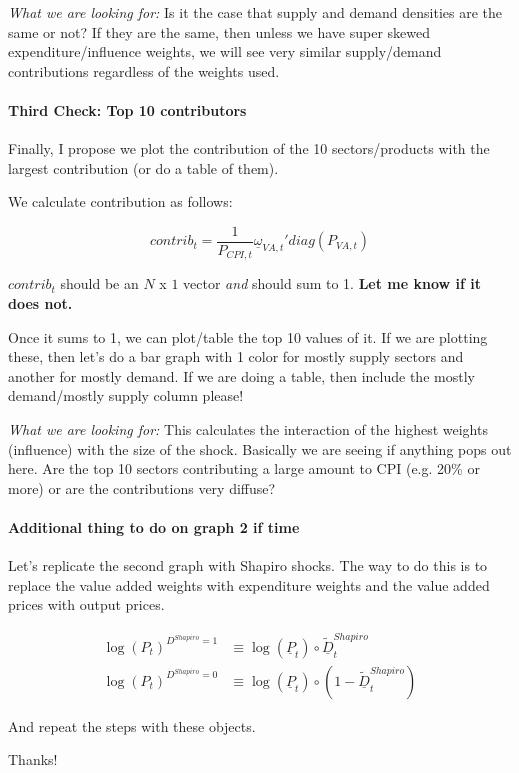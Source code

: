 \documentclass[12pt,english]{article}
\begin{document}
\emph{What we are looking for:} Is it the case that supply and demand densities are the same or not? If they are the same, then unless we have super skewed expenditure/influence weights, we will see very similar supply/demand contributions regardless of the weights used.

\paragraph{Third Check: Top 10 contributors}

Finally, I propose we plot the contribution of the 10 sectors/products with the largest contribution (or do a table of them).

We calculate contribution as follows:

\[
	contrib_t =\frac{1}{P_{CPI,t}}\underline{\omega}_{VA,t}'diag(P_{VA,t})
\]
 
 $contrib_t$ should be an $N$ x $1$ vector \emph{and} should sum to 1. {\bf Let me know if it does not.}
 
 Once it sums to 1, we can plot/table the top 10 values of it. If we are plotting these, then let's do a bar graph with 1 color for mostly supply sectors and another for mostly demand. If we are doing a table, then include the mostly demand/mostly supply column please!

\emph{What we are looking for:} This calculates the interaction of the highest weights (influence) with the size of the shock. Basically we are seeing if anything pops out here. Are the top 10 sectors contributing a large amount to CPI (e.g. 20\% or more) or are the contributions very diffuse?


\paragraph{Additional thing to do on graph 2 if time}

Let's replicate the second graph with Shapiro shocks. The way to do this is to replace the value added weights with expenditure weights and the value added prices with output prices. 


\begin{align*}
	\log(P_{t})^{D^{Shapiro}=1} &\equiv \log(\underline{P}_{t}) \circ \tilde{\underline{D}}_t^{Shapiro}\\
	\log(P_{t})^{D^{Shapiro}=0} &\equiv \log(\underline{P}_{t})\circ (1-\tilde{\underline{D}}_t^{Shapiro}) 
\end{align*}

And repeat the steps with these objects.

Thanks!
\end{document}
